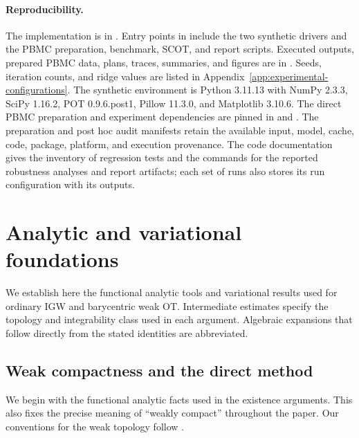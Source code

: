 \documentclass[11pt]{article}
\theoremstyle{plain}
\theoremstyle{definition}
\theoremstyle{remark}
\let\appendixproof\proof
\let\endappendixproof\endproof
\begin{document}
\paragraph{Reproducibility.}
The implementation is in . Entry points in
 include the two synthetic drivers and the PBMC preparation,
benchmark, SCOT, and report scripts. Executed outputs, prepared PBMC data, plans,
traces, summaries, and figures are in . Seeds, iteration
counts, and ridge values are listed in
Appendix~\ref{app:experimental-configurations}. The synthetic environment is
Python 3.11.13 with NumPy 2.3.3, SciPy 1.16.2, POT 0.9.6.post1, Pillow 11.3.0,
and Matplotlib 3.10.6. The direct PBMC preparation and experiment dependencies
are pinned in  and
. The preparation and post hoc
audit manifests retain the available input, model, cache, code, package, platform,
and execution provenance. The code documentation gives the inventory of regression tests
and the commands for the reported robustness analyses and report artifacts; each set of runs also
stores its run configuration with its outputs.
\fi

\let\proof\appendixproof
\let\endproof\endappendixproof
\appendix

\section{Analytic and variational foundations}
\label{app:detailed-proofs}\label{app:variational-proofs}

We establish here the functional analytic tools and variational results used for
ordinary IGW and barycentric weak OT. Intermediate estimates specify the topology and
integrability class used in each argument. Algebraic expansions that follow directly
from the stated identities are abbreviated.

\subsection{Weak compactness and the direct method}
\label{app:weak-compactness-direct-method}

We begin with the functional analytic facts used in the existence arguments. This
also fixes the precise meaning of ``weakly compact'' throughout the paper.
Our conventions for the weak topology follow
\cite[Sections~3.2--3.3 and Chapter~5]{BrezisFA}.
\end{document}
